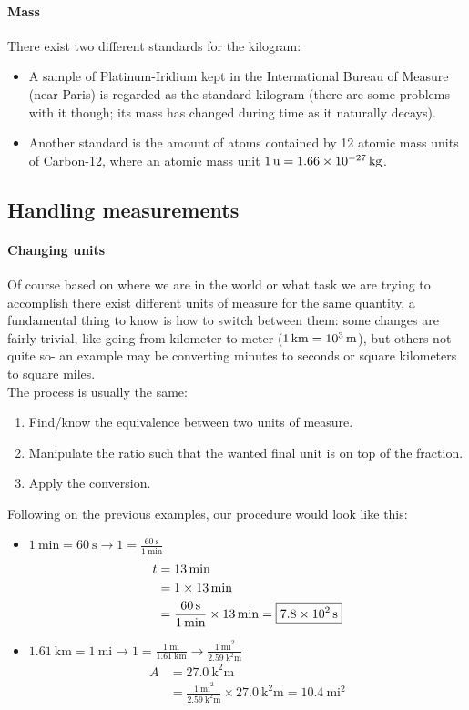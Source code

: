\paragraph{Mass} There exist two different standards for the kilogram:
\begin{itemize}
    \item A sample of Platinum-Iridium kept in the International Bureau of Measure (near Paris) is regarded as the standard kilogram (there are some problems with it though; its mass has changed during time as it naturally decays).
    \item Another standard is the amount of atoms contained by 12 atomic mass units of Carbon-12, where an atomic mass unit $\SI{1}{\atomicmassunit}=\SI{1.66E-27}{\kilogram}$.
\end{itemize}
\subsection{Handling measurements}
\paragraph{Changing units} Of course based on where we are in the world or what task we are trying to accomplish there exist different units of measure for the same quantity, a fundamental thing to know is how to switch between them: some changes are fairly trivial, like going from kilometer to meter ($\SI{1}{\kilo\metre} = \SI{E3}{\metre}$), but others not quite so- an example may be converting minutes to seconds or square kilometers to square miles.\\
The process is usually the same:
\begin{enumerate}
    \item Find/know the equivalence between two units of measure.
    \item Manipulate the ratio such that the wanted final unit is on top of the fraction.
    \item Apply the conversion.
\end{enumerate}
Following on the previous examples, our procedure would look like this:
\begin{itemize}
    \item $\SI{1}{\minute}=\SI{60}{\second}\to 1=\frac{\SI{60}{\second}}{\SI{1}{\minute}}$
    \begin{align*}
        t&=\SI{13}{\minute}\\
        &=1\times\SI{13}{\minute}\\
        &=\frac{\SI{60}{\second}}{\SI{1}{\minute}}\times\SI{13}{\minute} = \boxed{\SI{7.8E2}{\second}}
    \end{align*}
    \item $\SI{1.61}{\kilo\metre} = \SI{1}{\mathrm{mi}}\to 1=\frac{\SI{1}{\mathrm{mi}}}{\SI{1.61}{\kilo\metre}}\to \frac{\SI{1}{\mathrm{mi}^2}}{\SI{2.59}{\square\kilo\metre}}$
    \begin{align*}
        A&=\SI{27.0}{\square\kilo\metre}\\
        &=\frac{\SI{1}{\mathrm{mi}^2}}{\SI{2.59}{\square\kilo\metre}}\times\SI{27.0}{\square\kilo\metre}= \boxed{\SI{10.4}{\mathrm{mi}^2}}
    \end{align*}
\end{itemize}
